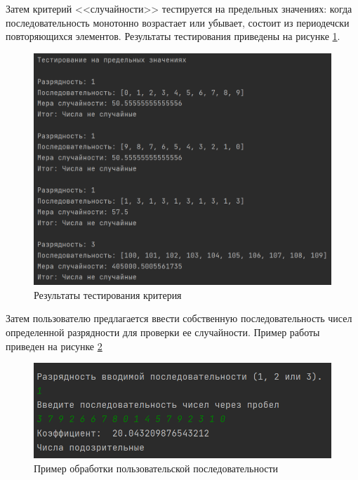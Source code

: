 \documentclass[14pt, a4paper]{extarticle}
\begin{document}
\newpage
Затем критерий <<случайности>> тестируется на предельных значениях: когда последовательность монотонно возрастает или убывает, состоит из периодечски повторяющихся элементов. Результаты тестирования приведены на рисунке \ref{pic:3}.
\begin{figure}[h]
	\begin{center}
		{\includegraphics[scale=0.85]{pictures/res_limit.png}
			\caption{Результаты тестирования критерия}
			\label{pic:3}}
	\end{center}
\end{figure}


\newpage
Затем пользователю предлагается ввести собственную последовательность чисел определенной разрядности для проверки ее случайности. Пример работы приведен на рисунке \ref{pic:4}
\begin{figure}[h]
	\begin{center}
		{\includegraphics[scale=1]{pictures/res_user.png}
			\caption{Пример обработки пользовательской последовательности}
			\label{pic:4}}
	\end{center}
\end{figure}
\end{document}
